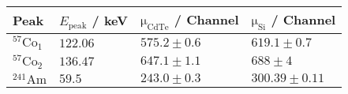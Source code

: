 	\begin{tabular}{|p{3cm}|p{3cm}|p{3cm}|p{3cm}|}
		\hline
		\rowcolor{tabcolor}
		Peak   & $E_\mathrm{peak}$ / keV & $\mathrm{\mu_{CdTe}}$ / Channel & $\mathrm{\mu_{Si}}$ / Channel\\ 
		\hline
		$^{57}\mathrm{Co}_1$ & $122.06$ & $575.2 \pm 0.6$ & $619.1 \pm 0.7$ \\ 
		$^{57}\mathrm{Co}_2$ & $136.47$ & $647.1 \pm 1.1$ & $688 \pm 4$ \\ 
		$^{241}\mathrm{Am}$ & $59.5$ & $243.0 \pm 0.3$ & $300.39 \pm 0.11$ \\ 
		\hline
	\end{tabular}
